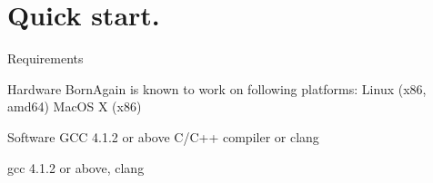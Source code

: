 \newpage

\section{Quick start.}


Requirements

Hardware
BornAgain is known to work on following platforms:
Linux (x86, amd64)
MacOS X (x86)

Software
GCC 4.1.2 or above   C/C++ compiler
or
clang

gcc 4.1.2 or above, clang